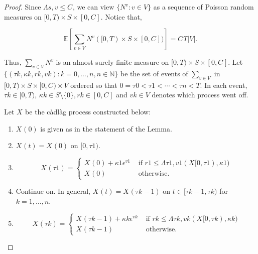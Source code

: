 \documentclass[12pt]{article}
\newcommand{\mb}{\mathbb}
\newcommand{\te}{\text}
\newcommand{\ep}{\epsilon}
\newcommand{\ind}{\hspace{24pt}}
\newcommand{\ex}[1]{\mb{E}\left[#1\right]}			%
\renewcommand{\v}{v}							%
\renewcommand{\S}{S}							%
\newcommand{\ev}{\ep}							%
\newcommand{\T}{T}								%
\renewcommand{\t}{t}							%
\renewcommand{\tt}{s}							%
\newcommand{\X}{X}								%
\newcommand{\vind}[1]{^{#1}}					%
\newcommand{\cind}[1]{_{#1}}					%
\newcommand{\tp}[1]{(#1)}						%
\newcommand{\tip}[1]{#1}						%
\newcommand{\const}{C}							%
\newcommand{\poiss}{N}							%
\renewcommand{\r}{r}							%
\newcommand{\indx}[1]{_{#1}}					%
\newcommand{\rt}{\tau}							%
\renewcommand{\it}{k}							%
\renewcommand{\mark}{\kappa}					%
\newcommand{\ratee}{\Lambda}					%
\begin{document}
\begin{proof}
Since \(\ratee{\tt,\v} \leq \const\indx{}\), we can view \(\{\poiss\vind{\v}:\v\in V\}\) as a sequence of Poisson random measures on \([0,\T)\times \S\times [0,\const\indx{}]\). Notice that,

\[\ex{\sum_{\v\in V}\poiss\vind{\v}([0,\T)\times\S\times[0,\const\indx{}])} = \const\indx{}\T|V|.\]

Thus, \(\sum_{\v\in V}\poiss\vind{\v}\) is an almost surely finite measure on \([0,\T)\times \S\times [0,\const\indx{}]\). Let \(\{(\rt{\it},\mark{\it},\r{\it},\v{\it}):\it = 0,\dots,n, n\in \mb{N}\}\) be the set of events of \(\sum_{\v\in V}\) in \([0,\T)\times\S\times [0,\const\indx{})\times V\) ordered so that \(0=\rt{0} < \rt{1} < \cdots < \rt{n} < \T\). In each event, \(\rt{\it} \in [0,\T)\), \(\mark{\it}\in \S\setminus\{0\}, \r{\it} \in [0,\const\indx{}]\) and \(\v{\it} \in V\) denotes which process went off.

\ind Let \(\X\cind{}\tip{}\) be the c\`adl\`ag process constructed below:

\begin{enumerate}
\item \(\X\cind{}\tp{0}\) is given as in the statement of the Lemma.

\item \(\X\cind{}\tp{\t} = \X\cind{}\tp{0}\) on \([0,\rt{1})\).

\item 

\[\X\cind{}\tp{\rt{1}} = \begin{cases}
\X\cind{}\tp{0} + \mark{1}\ev\vind{\v{1}} &\te{ if } \r{1} \leq \ratee{\rt{1},\v{1}}(\X\cind{}\tip{[0,\rt{1})},\mark{1})\\
\X\cind{}\tp{0} &\te{ otherwise.}
\end{cases}
\] 

\item Continue on. In general, \(\X\cind{}\tp{\t} = \X\cind{}\tp{\rt{\it-1}}\) on \(\t \in [\rt{\it-1},\rt{\it})\) for \(\it= 1,\dots,n\).

\item 

\[\X\cind{}\tp{\rt{\it}} = \begin{cases}
\X\cind{}\tp{\rt{\it-1}} + \mark{\it}\ev\vind{\v{\it}} &\te{ if } \r{\it} \leq \ratee{\rt{\it},\v{\it}}(\X\cind{}\tip{[0,\rt{\it})},\mark{\it})\\
\X\cind{}\tp{\rt{\it-1}} &\te{ otherwise.}
\end{cases}\]


\end{enumerate}
\end{proof}
\end{document}
